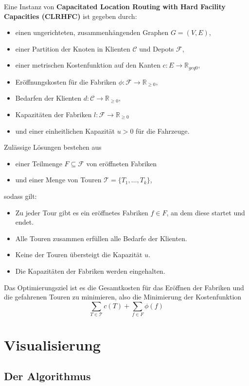 \documentclass[a4paper,ngerman,12pt,bibtotoc]{scrartcl}
\theoremstyle{definition}
\theoremstyle{plain}
\theoremstyle{remark}
\newcommand{\IR}{\mathbb{R}}
\newcommand{\Tc}{\mathcal{T}}
\newcommand{\ClientSet}{\mathscr{C}}
\newcommand{\FacilitySet}{\mathscr{F}}
\begin{document}
	Eine Instanz von \textbf{Capacitated Location Routing with Hard Facility Capacities (CLRHFC)} ist gegeben durch:
	\begin{itemize}
		\item einen ungerichteten, zusammenhängenden Graphen $G =(V,E)$,
		\item einer Partition der Knoten in Klienten $\ClientSet$ und Depots $\FacilitySet$,
		\item einer metrischen Kostenfunktion auf den Kanten $c: E \to \IR_{geq 0}$,
		\item Eröffnungskosten für die Fabriken $\phi: \FacilitySet \to \IR_{\geq 0}$,
		\item Bedarfen der Klienten $d: \ClientSet \to \IR_{\geq 0}$,
		\item Kapazitäten der Fabriken $l: \FacilitySet \to \IR_{\geq 0}$
		\item und einer einheitlichen Kapazität $u > 0$ für die Fahrzeuge.		
	\end{itemize}
	Zulässige Lösungen bestehen aus
	\begin{itemize}
		\item einer Teilmenge $F \subseteq \FacilitySet$ von eröffneten Fabriken
		\item und einer Menge von Touren $\Tc = \{T_1, \dots, T_k\}$,
	\end{itemize}
	sodass gilt:
	\begin{itemize}
		\item Zu jeder Tour gibt es ein eröffnetes Fabriken $f \in F$, an dem diese startet und endet.
		\item Alle Touren zusammen erfüllen alle Bedarfe der Klienten.
		\item Keine der Touren übersteigt die Kapazität $u$.
		\item Die Kapazitäten der Fabriken werden eingehalten.
	\end{itemize}
	Das Optimierungsziel ist es die Gesamtkosten für das Eröffnen der Fabriken und die gefahrenen Touren zu minimieren, also die Minimierung der Kostenfunktion
	\[\sum_{T\in\Tc} c(T) + \sum_{f\in F}\phi(f) \]

	
	\section{Visualisierung}
	
	\subsection{Der Algorithmus}
	
\end{document}
